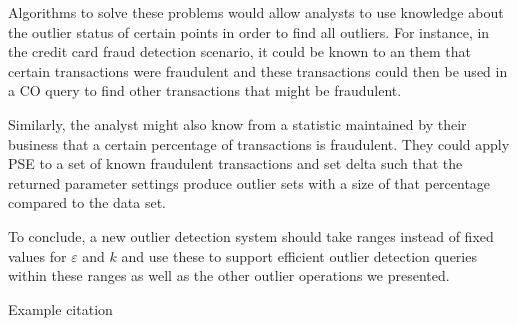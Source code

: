 \documentclass[runningheads]{llncs}
\begin{document}
Algorithms to solve these problems would allow analysts to use knowledge about the outlier status of certain points in order to find all outliers. For instance, in the credit card fraud detection scenario, it could be known to an them that certain transactions were fraudulent and these transactions could then be used in a CO query to find other transactions that might be fraudulent.

Similarly, the analyst might also know from a statistic maintained by their business that a certain percentage of transactions is fraudulent. They could apply PSE to a set of known fraudulent transactions and set delta such that the returned parameter settings produce outlier sets with a size of that percentage compared to the data set.

To conclude, a new outlier detection system should take ranges instead of fixed values for $\varepsilon$ and $k$ and use these to support efficient outlier detection queries within these ranges as well as the other outlier operations we presented.

Example citation \cite{DBLP:conf/civr/BeecksUS10}

%
%


  
\end{document}
